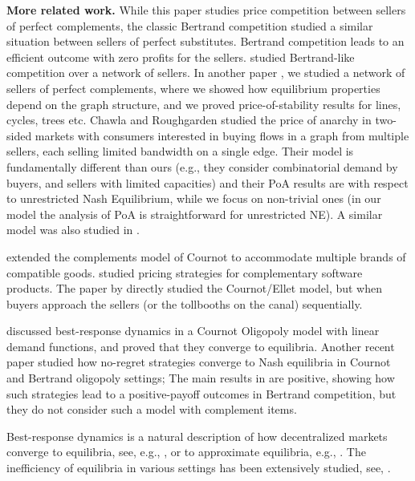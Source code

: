 \noindent \textbf{More related work.}
While this paper studies price competition between sellers of perfect complements, the classic Bertrand competition \cite{Bert83} studied a similar situation between sellers of perfect substitutes. Bertrand competition leads to an efficient outcome with zero profits for the sellers.
\cite{BLN13} studied Bertrand-like competition over a network of sellers.
In another paper \cite{BBN16}, we studied a network of sellers
of perfect complements, where we showed how equilibrium properties depend on the graph structure, and we proved price-of-stability results for lines, cycles, trees etc.
Chawla and Roughgarden \cite{CR08} studied the price of anarchy in two-sided markets with consumers interested in buying flows in a graph from multiple sellers, each selling limited bandwidth on a single edge. Their model is fundamentally different than ours (e.g., they consider combinatorial demand by buyers, and sellers with limited capacities) and their PoA results are with respect to unrestricted Nash Equilibrium, while we focus on non-trivial ones (in our model the analysis of PoA is straightforward for unrestricted NE). A similar model was also studied in \cite{CN09}.

\cite{ES92} extended the complements model of Cournot to accommodate multiple brands of compatible goods. \cite{EK06} studied pricing strategies for complementary software products. The paper by \cite{FK01} directly studied the Cournot/Ellet model, but when buyers approach the sellers (or the tollbooths on the canal) sequentially.

\cite{FKLMO13} discussed best-response dynamics in a Cournot Oligopoly model with linear demand functions, and proved that they converge to equilibria.
Another recent paper \cite{NP10} studied how no-regret strategies converge to Nash equilibria in Cournot and Bertrand oligopoly settings;
The main results in \cite{NP10} are positive, showing how such strategies lead to a positive-payoff outcomes in Bertrand competition, but they do not consider such a model with complement items.

Best-response dynamics is a natural description of how decentralized markets converge to equilibria, see, e.g., \cite{FPT04,NSVZ11}, or to approximate equilibria, e.g., \cite{AAEMS08,SV08}.
The inefficiency of equilibria in various settings has been extensively studied, see, \cite{KP99, RT02, Rou15, ADKTWR08,HHT14}.

